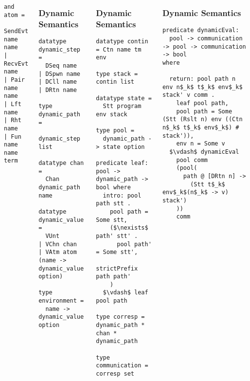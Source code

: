 \documentclass{beamer}
\begin{document}
\begin{frame}[fragile]
\begin{columns}
\begin{frame}[fragile]
\begin{lstlisting}[language=logic, mathescape]
and atom = 
  SendEvt name name
| RecvEvt name
| Pair name name
| Lft name
| Rht name
| Fun name name term 
\end{lstlisting}
\end{frame}


\begin{frame}[fragile]
	\frametitle{Dynamic Semantics}
\begin{lstlisting}[language=logic, mathescape]
datatype dynamic_step =
  DSeq name
| DSpwn name
| DCll name
| DRtn name 

type dynamic_path =
  dynamic_step list

datatype chan =
  Chan dynamic_path name 

datatype dynamic_value = 
  VUnt
| VChn chan
| VAtm atom (name -> dynamic_value option)

type environment =
  name -> dynamic_value option
\end{lstlisting}
\end{frame}


\begin{frame}[fragile]
	\frametitle{Dynamic Semantics}
\begin{lstlisting}[language=logic, mathescape]
datatype contin = Ctn name tm env

type stack = contin list

datatype state =
  Stt program env stack 

type pool =
  dynamic_path -> state option

predicate leaf: pool -> dynamic_path -> bool where
  intro: pool path stt .
    pool path = Some stt,
    ($\nexists$ path' stt' .
      pool path' = Some stt',
      strictPrefix path path'
    )
  $\vdash$ leaf pool path

type corresp = dynamic_path * chan * dynamic_path

type communication = corresp set 
\end{lstlisting}
\end{frame}


\begin{frame}[fragile]
	\frametitle{Dynamic Semantics}
\begin{lstlisting}[language=logic, mathescape]
predicate dynamicEval:
  pool -> communication -> pool -> communication -> bool
where

  return: pool path n env n$_k$ t$_k$ env$_k$ stack' v comm .
    leaf pool path,
    pool path = Some (Stt (Rslt n) env ((Ctn n$_k$ t$_k$ env$_k$) # stack')),
    env n = Some v
  $\vdash$ dynamicEval
    pool comm
    (pool(
      path @ [DRtn n] ->
        (Stt t$_k$ env$_k$(n$_k$ -> v) stack')
    ))
    comm


\end{lstlisting}
\end{frame}
\end{columns}
\end{frame}
\end{document}
